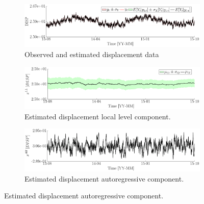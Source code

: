 \begin{figure}[h!]
\centering
\begin{subfigure}{\linewidth}\centering
\includegraphics[width=0.9\linewidth]{./docfigs/Example_DISPTEMPSIM/optim_param_optim_initialhiddenstate/DISP_ObservedPredicted.pdf}
\caption{Observed and estimated displacement data} 
\end{subfigure}
\begin{subfigure}{\linewidth}\centering
\includegraphics[width=0.9\linewidth]{./docfigs/Example_DISPTEMPSIM/optim_param_optim_initialhiddenstate/DISP_LL_1.pdf}
\caption{Estimated displacement local level component.}
\end{subfigure}
\begin{subfigure}{\linewidth}\centering
\includegraphics[width=0.9\linewidth]{./docfigs/Example_DISPTEMPSIM/optim_param_optim_initialhiddenstate/DISP_AR_2.pdf}
\caption{Estimated displacement autoregressive component.}
\end{subfigure}
\end{figure}
